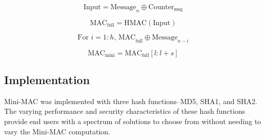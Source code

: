 


\begin{equation}
\text{Input} = \text{Message}_n\oplus\text{Counter}_{\text{msg}}
\end{equation}

\begin{equation}
\text{MAC}_{\text{full}} = \text{HMAC}(\text{Input})
\end{equation}

\begin{equation}
\text{For }i=1:h \text{, MAC}_{\text{full}}\oplus\text{Message}_{n-i}
\end{equation}

\begin{equation}
\text{MAC}_{\text{mini}} = \text{MAC}_{\text{full}}[l:l+s]
\end{equation}


\subsection{Implementation}
Mini-MAC was implemented with three hash functions--MD5, SHA1, and SHA2. The varying performance and security characteristics of these hash functions provide end users with a spectrum of solutions to choose from without needing to vary the Mini-MAC computation.

